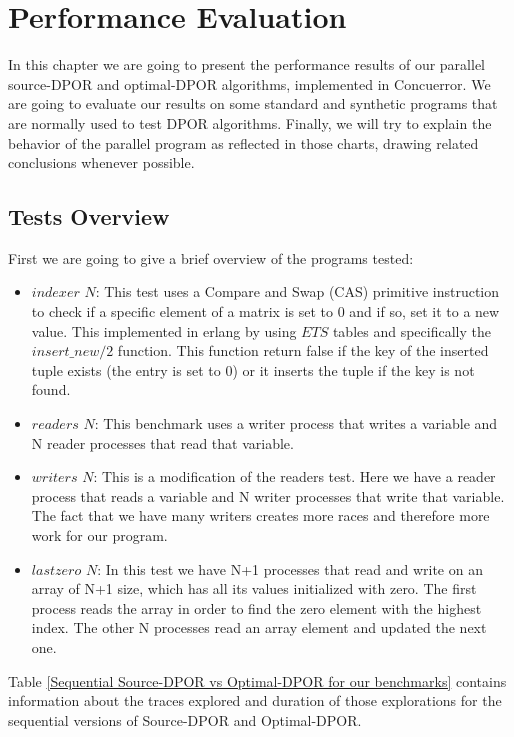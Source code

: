\chapter{Performance Evaluation}
\label{perfresults}

In this chapter we are going to present the performance results of our parallel source-DPOR and optimal-DPOR algorithms,
implemented in Concuerror. We are going to evaluate our results on some standard and synthetic programs that are normally
used to test DPOR algorithms. Finally, we will try to explain the behavior of the parallel program as reflected in those
charts, drawing related conclusions whenever possible.

\section{Tests Overview}

First we are going to give a brief overview of the programs tested:

\begin{itemize}
    \item $indexer$ $N$: This test uses a Compare and Swap (CAS) primitive instruction to check if a specific element of
    a matrix is set to 0 and if so, set it to a new value. This implemented in erlang by using $ETS$ tables and specifically
    the $insert\_new/2$ function. This function return false if the key of the inserted tuple exists (the entry is set to 0)
    or it inserts the tuple if the key is not found.
    \item $readers$ $N$: This benchmark uses a writer process that writes a variable and N reader processes that read that variable.
    \item $writers$ $N$: This is a modification of the readers test. Here we have a reader process that reads a variable and 
    N writer processes that write that variable. The fact that we have many writers creates more races and therefore more work
    for our program.
    \item $ lastzero$ $N$: In this test we have N+1 processes that read and write on an array of N+1 size, which has all its 
    values initialized with zero. The first process reads the array in order to find the zero element with the highest
    index. The other N processes read an array element and updated the next one.
\end{itemize}

Table \ref{Sequential Source-DPOR vs Optimal-DPOR for our benchmarks} contains information about the traces explored and duration of those
explorations for the sequential versions of Source-DPOR and Optimal-DPOR.

